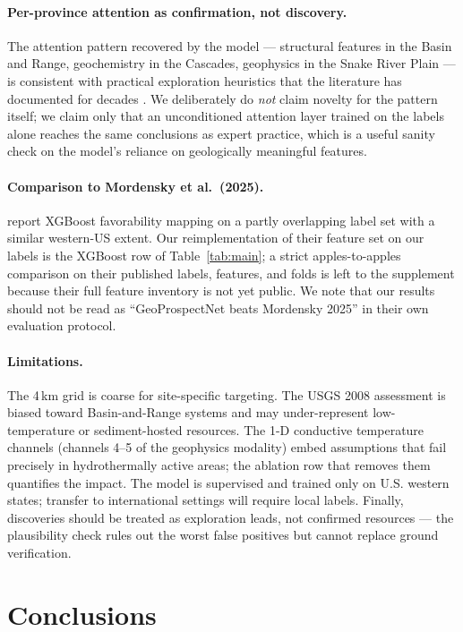 \documentclass[review,12pt]{elsarticle}
\begin{document}
\paragraph{Per-province attention as confirmation, not discovery.} The attention pattern recovered by the model — structural features in the Basin and Range, geochemistry in the Cascades, geophysics in the Snake River Plain — is consistent with practical exploration heuristics that the literature has documented for decades \citep{Coolbaugh2005,Faulds2020}. We deliberately do \emph{not} claim novelty for the pattern itself; we claim only that an unconditioned attention layer trained on the labels alone reaches the same conclusions as expert practice, which is a useful sanity check on the model's reliance on geologically meaningful features.

\paragraph{Comparison to Mordensky et al.\ (2025).} \citet{Mordensky2025} report XGBoost favorability mapping on a partly overlapping label set with a similar western-US extent. Our reimplementation of their feature set on our labels is the XGBoost row of Table~\ref{tab:main}; a strict apples-to-apples comparison on their published labels, features, and folds is left to the supplement because their full feature inventory is not yet public. We note that our results should not be read as ``GeoProspectNet beats Mordensky 2025'' in their own evaluation protocol.

\paragraph{Limitations.} The 4\,km grid is coarse for site-specific targeting. The USGS 2008 assessment is biased toward Basin-and-Range systems and may under-represent low-temperature or sediment-hosted resources. The 1-D conductive temperature channels (channels 4–5 of the geophysics modality) embed assumptions that fail precisely in hydrothermally active areas; the ablation row that removes them quantifies the impact. The model is supervised and trained only on U.S. western states; transfer to international settings will require local labels. Finally, discoveries should be treated as exploration leads, not confirmed resources — the plausibility check rules out the worst false positives but cannot replace ground verification.

\section{Conclusions}
\end{document}
